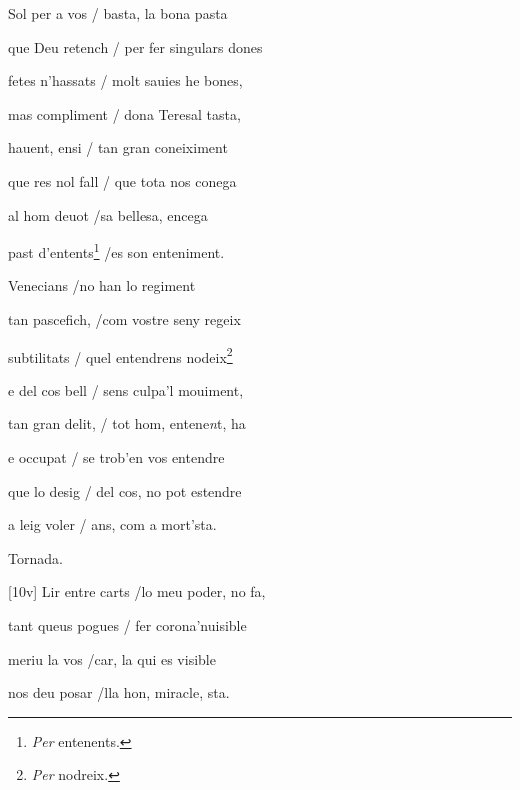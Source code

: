 \documentclass[12pt]{article}
\begin{document}
\begin{estrofa}

 Sol per a vos / basta, la bona pasta

 que Deu retench / per fer singulars dones

 fetes n'hassats / molt sauies he bones,

 mas compliment / dona Teresal tasta,

 hauent, ensi / tan gran coneiximent

 que res nol fall / que tota nos conega

 al hom deuot /sa bellesa, encega

 past d'entents\footnote{\textit{Per} entenents.} /es son enteniment.

\end{estrofa}



\begin{estrofa}

 Venecians /no han lo regiment

 tan pascefich, /com vostre seny regeix

 subtilitats / quel entendrens nodeix\footnote{\textit{Per} nodreix.}

 e del cos bell / sens culpa'l mouiment,

 tan gran delit, / tot hom, entene\textit{n}t, ha

 e occupat / se trob'en vos entendre

 que lo desig / del cos, no pot estendre

 a leig voler / ans, com a mort'sta.

\end{estrofa}


\begin{estrofaExtra}%




\begin{tornada}

Tornada.

\end{tornada}


\end{estrofaExtra}


\begin{estrofa}

 [10v] Lir entre carts /lo meu poder, no fa,

 tant queus pogues /  fer corona'nuisible

 meriu  la vos /car, la qui es visible

 nos deu posar /lla hon, miracle, sta.

\end{estrofa}
\end{document}
